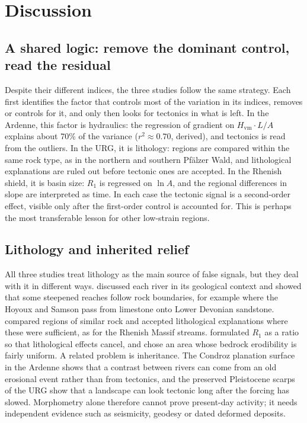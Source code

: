 \documentclass[10pt,a4paper,twocolumn]{article}
\newcommand{\Hvm}{\ensuremath{H_\mathrm{vm}}}
\begin{document}
\section{Discussion}

\subsection{A shared logic: remove the dominant control, read the residual}

Despite their different indices, the three studies follow the same strategy. Each first identifies
the factor that controls most of the variation in its indices, removes or controls for it, and only
then looks for tectonics in what is left. In the Ardenne, this factor is hydraulics: the regression of
gradient on $\Hvm\cdot L/A$ explains about 70\% of the variance ($r^2\approx0.70$, derived), and tectonics is
read from the outliers. In the URG, it is lithology: regions are compared within the same rock type,
as in the northern and southern Pfälzer Wald, and lithological explanations are ruled out before
tectonic ones are accepted. In the Rhenish shield, it is basin size: $R_1$ is regressed on $\ln A$, and
the regional differences in slope are interpreted as time. In each case the tectonic signal is a
second-order effect, visible only after the first-order control is accounted for. This is perhaps the
most transferable lesson for other low-strain regions.

\subsection{Lithology and inherited relief}

All three studies treat lithology as the main source of false signals, but they deal with it in
different ways. \citet{Demoulin1998} discussed each river in its geological context and showed that
some steepened reaches follow rock boundaries, for example where the Hoyoux and Samson pass from
limestone onto Lower Devonian sandstone. \citet{PetersVanBalen2007} compared regions of similar rock
and accepted lithological explanations where these were sufficient, as for the Rhenish Massif streams.
\citet{Demoulin2011} formulated $R_1$ as a ratio so that lithological effects cancel, and chose an area whose bedrock erodibility is fairly uniform. A related problem is inheritance. The Condroz planation surface in the Ardenne shows that a contrast between rivers can come from an
old erosional event rather than from tectonics, and the preserved Pleistocene scarps of the URG
show that a landscape can look tectonic long after the forcing has slowed. Morphometry alone therefore cannot prove
present-day activity; it needs independent evidence such as seismicity, geodesy or dated deformed
deposits.
\end{document}
